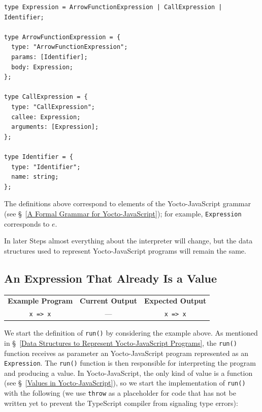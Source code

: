 \documentclass[12pt, oneside]{book}
\begin{document}
\begin{verbatim}
type Expression = ArrowFunctionExpression | CallExpression | Identifier;

type ArrowFunctionExpression = {
  type: "ArrowFunctionExpression";
  params: [Identifier];
  body: Expression;
};

type CallExpression = {
  type: "CallExpression";
  callee: Expression;
  arguments: [Expression];
};

type Identifier = {
  type: "Identifier";
  name: string;
};
\end{verbatim}

\begin{mdframed}[frametitle = {Advanced}]
The definitions above correspond to elements of the Yocto-JavaScript grammar (see §~\ref{A Formal Grammar for Yocto-JavaScript}); for example, \texttt{Expression} corresponds to $e$.
\end{mdframed}

In later Steps almost everything about the interpreter will change, but the data structures used to represent Yocto-JavaScript programs will remain the same.

\subsection{An Expression That Already Is a Value}
\label{An Expression That Already Is a Value}

\begin{center}
\begin{tabular}{c|c|c}
\textbf{Example Program} & \textbf{Current Output} & \textbf{Expected Output} \\
\texttt{x => x} & — & \texttt{x => x} \\
\end{tabular}
\end{center}

We start the definition of \texttt{run()} by considering the example above. As mentioned in §~\ref{Data Structures to Represent Yocto-JavaScript Programs}, the \texttt{run()} function receives as parameter an Yocto-JavaScript program represented as an \texttt{Expression}. The \texttt{run()} function is then responsible for interpreting the program and producing a value. In Yocto-JavaScript, the only kind of value is a function (see §~\ref{Values in Yocto-JavaScript}), so we start the implementation of \texttt{run()} with the following (we use \texttt{throw} as a placeholder for code that has not be written yet to prevent the TypeScript compiler from signaling type errors):
\end{document}
